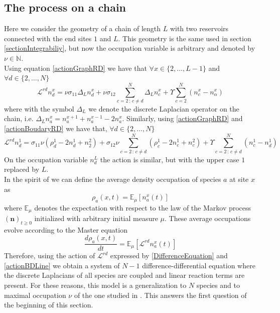 \documentclass[11pt]{article}
\numberwithin{equation}{section}
\numberwithin{equation}{subsection}
\begin{document}
\subsection{The process on a chain}
Here we consider the geometry of a chain of length $L$ with two reservoirs connected with the end sites $1$ and $L$. This geometry is the same used in section \ref{sectionIntegrabiliy}, but now the occupation variable is arbitrary and denoted by $\nu\in \mathbb{N}$.\\
Using equation \eqref{actionGraphRD} we have that $\forall x\in \{2,\ldots,L-1\}$ and $\forall d\in\{2,\ldots,N\}$
\begin{equation}\label{DifferenceEquation}
	\mathcal{L}^{rd}n_{d}^{x}=\nu\sigma_{11}\Delta_{L}n_{d}^{x}+\nu\sigma_{12}\sum_{c=2\,:\,c\neq d}^{N}\Delta_{L}n_{c}^{x}+\Upsilon\sum_{c=2}^{N}(n_{c}^{x}-n_{\alpha}^{x})
\end{equation}
where with the symbol $\Delta_{L}$ we denote the discrete Laplacian operator on the chain, i.e. $\Delta_{L}n_{a}^{x}=n_{a}^{x+1}+n_{a}^{x-1}-2n_{a}^{x}$.
Similarly, using \eqref{actionGraphRD}  and \eqref{actionBoudaryRD} we have that, $\forall d\in \{2,\ldots,N\}$ 
\begin{equation}\label{actionBDLine}
	\mathcal{L}^{rd}n_{d}^{1}=\sigma_{11}\nu \left(\rho_{d}^{1}-2n_{d}^{1}+n_{2}^{2}\right)+\sigma_{12}\nu\sum_{c=2\,:\,c\neq d}^{N}\left(\rho_{c}^{1}-2n_{c}^{1}+n_{c}^{2}\right)+\Upsilon\sum_{c=2\,:\,c\neq d}^{N}\left(n_{c}^{1}-n_{d}^{1}\right)
\end{equation}
On the occupation variable $n_{d}^{L}$ the action is similar, but with the upper case $1$ replaced by $L$.\\ In the spirit of \cite{casini2022uphill} we can define the average density occupation of species $a$ at site $x$ as
\begin{equation}
	\rho_{a}(x,t)=\mathbb{E}_{\mu}\left[n_{a}^{x}(t)\right]
\end{equation}
where $\mathbb{E}_{\mu}$ denotes the expectation with respect to the law of the Markov process $(\bm{n})_{t\geq 0}$ initialized with arbitrary initial measure $\mu$. These average occupations evolve according to the Master equation
\begin{equation}
	\frac{d \rho_{a}(x,t)}{dt}=\mathbb{E}_{\mu}\left[\mathcal{L}^{rd}n_{a}^{x}(t)\right]
\end{equation} 
Therefore, using the action of $\mathcal{L}^{rd}$ expressed by \eqref{DifferenceEquation} and \eqref{actionBDLine} we obtain a system of $N-1$ difference-differential equation where the discrete Laplacians of all species are coupled and linear reaction terms are present. For these reasons, this model is a generalization to $N$ species and to maximal occupation $\nu$ of the one studied in \cite{casini2022uphill}. This answers the first question of the beginning of this section. 
\end{document}
